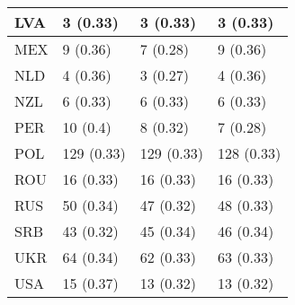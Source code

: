 \documentclass[]{article}
\begin{document}
\begin{table}
{\begin{tabular}[t]{l|l|l|l}
\hline
LVA & 3 (0.33) & 3 (0.33) & 3 (0.33)\\
\hline
MEX & 9 (0.36) & 7 (0.28) & 9 (0.36)\\
\hline
NLD & 4 (0.36) & 3 (0.27) & 4 (0.36)\\
\hline
NZL & 6 (0.33) & 6 (0.33) & 6 (0.33)\\
\hline
PER & 10 (0.4) & 8 (0.32) & 7 (0.28)\\
\hline
POL & 129 (0.33) & 129 (0.33) & 128 (0.33)\\
\hline
ROU & 16 (0.33) & 16 (0.33) & 16 (0.33)\\
\hline
RUS & 50 (0.34) & 47 (0.32) & 48 (0.33)\\
\hline
SRB & 43 (0.32) & 45 (0.34) & 46 (0.34)\\
\hline
UKR & 64 (0.34) & 62 (0.33) & 63 (0.33)\\
\hline
USA & 15 (0.37) & 13 (0.32) & 13 (0.32)\\
\hline
\end{tabular}}
\end{table}
\end{document}
